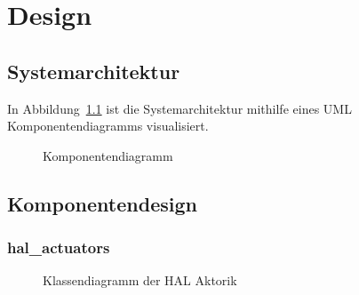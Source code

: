 \chapter{Design}\label{ch:design}



\section{Systemarchitektur}\label{sec:systemarchitektur}


In Abbildung~\ref{fig:cmp} ist die Systemarchitektur mithilfe eines UML Komponentendiagramms
visualisiert.

\begin{figure}[h]
    \centering
    \caption{Komponentendiagramm}
    \label{fig:cmp}
\end{figure}

\section{Komponentendesign}\label{sec:komponentendesign}

\subsection{hal\_actuators}\label{subsec:hal_actuators}

\begin{figure}
    \caption{Klassendiagramm der HAL Aktorik}
    \label{fig:cd-hal}
\end{figure}

